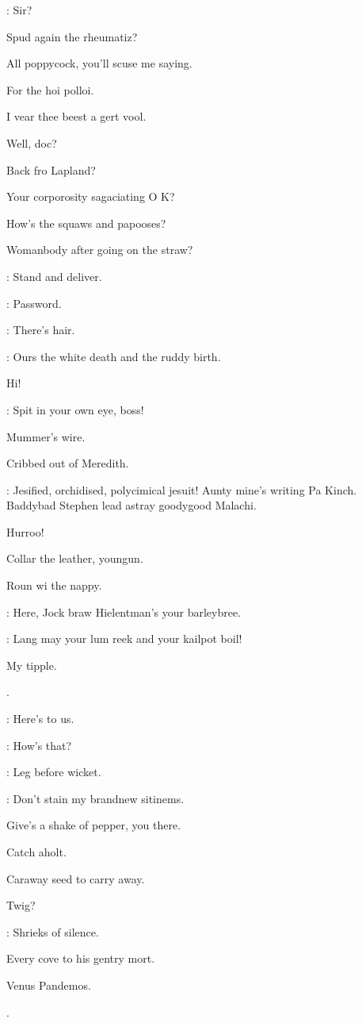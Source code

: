 \documentclass[12pt]{article}
\begin{document}
\Br: Sir?

Spud again the rheumatiz?

All poppycock, you'll scuse me saying.

For the hoi polloi.

I vear thee beest a gert vool.

Well, doc?

Back fro Lapland?

Your corporosity sagaciating O K?

How's the squaws and papooses?

Womanbody after going on the straw?

\Ln: Stand and deliver.

\Cr: Password.

\PC: There's hair.

\Bl: Ours the white death and the ruddy birth.

Hi!

\Ba: Spit in your own eye, boss!

Mummer's wire.

Cribbed out of Meredith.

\Mu: Jesified, orchidised, polycimical jesuit!
Aunty mine's writing Pa Kinch.
Baddybad Stephen lead astray goodygood Malachi.


Hurroo!

Collar the leather, youngun.

Roun wi the nappy.

\Ln: Here, Jock braw Hielentman's your barleybree.

\Cr: Lang may your lum reek and your kailpot boil!

My tipple.

.

\Dx: Here's to us.

\Md: How's that?

\Ly: Leg before wicket.

\Mu: Don't stain my brandnew sitinems.

Give's a shake of pepper, you there.

Catch aholt.

Caraway seed to carry away.

Twig?

: Shrieks of silence.

Every cove to his gentry mort.

Venus Pandemos.

.
\end{document}
